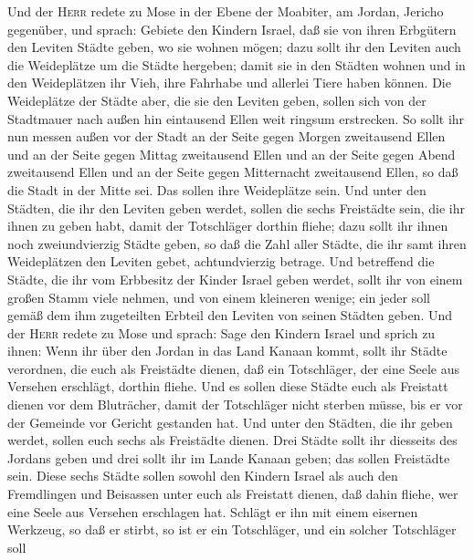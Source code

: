  Und der \textsc{Herr} redete zu Mose in der Ebene der
Moabiter, am Jordan, Jericho gegenüber, und sprach: 
Gebiete den Kindern Israel, daß sie von ihren Erbgütern den Leviten
Städte geben, wo sie wohnen mögen; dazu sollt ihr den Leviten auch die
Weideplätze um die Städte hergeben;  damit sie in den
Städten wohnen und in den Weideplätzen ihr Vieh, ihre Fahrhabe und
allerlei Tiere haben können.  Die Weideplätze der Städte
aber, die sie den Leviten geben, sollen sich von der Stadtmauer nach
außen hin eintausend Ellen weit ringsum erstrecken.  So
sollt ihr nun messen außen vor der Stadt an der Seite gegen Morgen
zweitausend Ellen und an der Seite gegen Mittag zweitausend Ellen und an
der Seite gegen Abend zweitausend Ellen und an der Seite gegen
Mitternacht zweitausend Ellen, so daß die Stadt in der Mitte sei.
 Das sollen ihre Weideplätze sein. Und unter den Städten,
die ihr den Leviten geben werdet, sollen die sechs Freistädte sein, die
ihr ihnen zu geben habt, damit der Totschläger dorthin fliehe; dazu
sollt ihr ihnen noch zweiundvierzig Städte geben,  so daß
die Zahl aller Städte, die ihr samt ihren Weideplätzen den Leviten
gebet, achtundvierzig betrage.  Und betreffend die Städte,
die ihr vom Erbbesitz der Kinder Israel geben werdet, sollt ihr von
einem großen Stamm viele nehmen, und von einem kleineren wenige; ein
jeder soll gemäß dem ihm zugeteilten Erbteil den Leviten von seinen
Städten geben.  Und der \textsc{Herr} redete zu Mose und
sprach:  Sage den Kindern Israel und sprich zu ihnen:
Wenn ihr über den Jordan in das Land Kanaan kommt, sollt ihr Städte
verordnen,  die euch als Freistädte dienen, daß ein
Totschläger, der eine Seele aus Versehen erschlägt, dorthin fliehe.
 Und es sollen diese Städte euch als Freistatt dienen vor
dem Bluträcher, damit der Totschläger nicht sterben müsse, bis er vor
der Gemeinde vor Gericht gestanden hat.  Und unter den
Städten, die ihr geben werdet, sollen euch sechs als Freistädte dienen.
 Drei Städte sollt ihr diesseits des Jordans geben und
drei sollt ihr im Lande Kanaan geben; das sollen Freistädte sein.
 Diese sechs Städte sollen sowohl den Kindern Israel als
auch den Fremdlingen und Beisassen unter euch als Freistatt dienen, daß
dahin fliehe, wer eine Seele aus Versehen erschlagen hat.
 Schlägt er ihn mit einem eisernen Werkzeug, so daß er
stirbt, so ist er ein Totschläger, und ein solcher Totschläger soll
